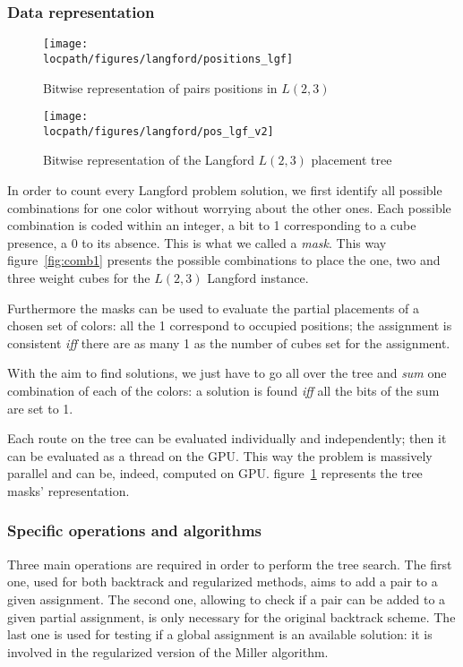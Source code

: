 \subsubsection{Data representation}

\begin{figure}[t!]
\begin{minipage}[b]{0.40\linewidth}
\centering
\texttt{[image: \\locpath/figures/langford/positions\_lgf]}
\caption{ Bitwise representation of pairs positions in $L(2,3)$} \label{fig:comb1}
\end{minipage}
\hfill
\begin{minipage}[b]{0.55\linewidth}
\centering
\texttt{[image: \\locpath/figures/langford/pos\_lgf\_v2]}
\caption{Bitwise representation of the Langford $L(2,3)$ placement tree}\label{fig:pos_lgf}
\end{minipage}
\end{figure}

In order to count every Langford problem solution, we first identify all possible combinations for one color without worrying about the other ones. 
Each possible combination is coded within an integer, a bit to 1 corresponding to a cube presence, a 0 to its absence. This is what we called a \emph{mask}.
This way figure~\ref{fig:comb1} presents the possible combinations to place the one, two and three weight cubes for the $L(2,3)$ Langford instance.

Furthermore the masks can be used to evaluate the partial placements of a chosen set of colors: all the 1 correspond to occupied positions; the assignment is consistent \emph{iff} there are as many 1 as the number of cubes set for the assignment. 

With the aim to find solutions, we just have to go all over the tree and \emph{sum} one combination of each of the colors: a solution is found \emph{iff} all the bits of the sum are set to 1. 

Each route on the tree can be evaluated individually and independently; then it can be evaluated as a thread on the GPU.
This way the problem is massively parallel and can be, indeed, computed on GPU. figure~\ref{fig:pos_lgf} represents the tree masks' representation.

\subsubsection{Specific operations and algorithms}

Three main operations are required in order to perform the tree search. 
The first one, used for both backtrack and regularized methods, aims to add a pair to a given assignment. 
The second one, allowing to check if a pair can be added to a given partial assignment, is only necessary for the original backtrack scheme.
The last one is used for testing if a global assignment is an available solution: it is involved in the regularized version of the Miller algorithm.

